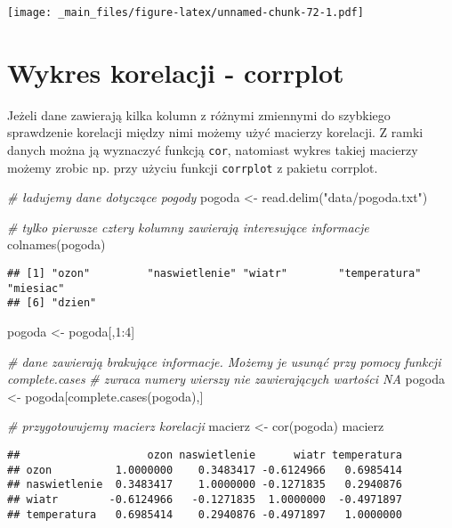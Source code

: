 \documentclass[
]{book}
\newenvironment{Shaded}{\begin{snugshade}}{\end{snugshade}}
\newcommand{\CommentTok}[1]{\textcolor[rgb]{0.56,0.35,0.01}{\textit{#1}}}
\newcommand{\DecValTok}[1]{\textcolor[rgb]{0.00,0.00,0.81}{#1}}
\newcommand{\FunctionTok}[1]{\textcolor[rgb]{0.00,0.00,0.00}{#1}}
\newcommand{\NormalTok}[1]{#1}
\newcommand{\OtherTok}[1]{\textcolor[rgb]{0.56,0.35,0.01}{#1}}
\newcommand{\SpecialCharTok}[1]{\textcolor[rgb]{0.00,0.00,0.00}{#1}}
\newcommand{\StringTok}[1]{\textcolor[rgb]{0.31,0.60,0.02}{#1}}
\begin{document}
\texttt{[image: \_main\_files/figure-latex/unnamed-chunk-72-1.pdf]}

\hypertarget{wykres-korelacji---corrplot}{%
\section{Wykres korelacji - corrplot}\label{wykres-korelacji---corrplot}}

Jeżeli dane zawierają kilka kolumn z różnymi zmiennymi do szybkiego sprawdzenie korelacji między nimi możemy użyć macierzy korelacji. Z ramki danych można ją wyznaczyć funkcją \texttt{cor}, natomiast wykres takiej macierzy możemy zrobic np. przy użyciu funkcji \texttt{corrplot} z pakietu corrplot.

\begin{Shaded}
\begin{Highlighting}[]
\CommentTok{\# ładujemy dane dotyczące pogody}
\NormalTok{pogoda }\OtherTok{\textless{}{-}} \FunctionTok{read.delim}\NormalTok{(}\StringTok{"data/pogoda.txt"}\NormalTok{)}

\CommentTok{\# tylko pierwsze cztery kolumny zawierają interesujące informacje}
\FunctionTok{colnames}\NormalTok{(pogoda)}
\end{Highlighting}
\end{Shaded}

\begin{verbatim}
## [1] "ozon"         "naswietlenie" "wiatr"        "temperatura"  "miesiac"     
## [6] "dzien"
\end{verbatim}

\begin{Shaded}
\begin{Highlighting}[]
\NormalTok{pogoda }\OtherTok{\textless{}{-}}\NormalTok{ pogoda[,}\DecValTok{1}\SpecialCharTok{:}\DecValTok{4}\NormalTok{]}

\CommentTok{\# dane zawierają brakujące informacje. Możemy je usunąć przy pomocy funkcji complete.cases}
\CommentTok{\# zwraca numery wierszy nie zawierających wartości NA}
\NormalTok{pogoda }\OtherTok{\textless{}{-}}\NormalTok{ pogoda[}\FunctionTok{complete.cases}\NormalTok{(pogoda),]}

\CommentTok{\# przygotowujemy macierz korelacji}
\NormalTok{macierz }\OtherTok{\textless{}{-}} \FunctionTok{cor}\NormalTok{(pogoda)}
\NormalTok{macierz}
\end{Highlighting}
\end{Shaded}

\begin{verbatim}
##                    ozon naswietlenie      wiatr temperatura
## ozon          1.0000000    0.3483417 -0.6124966   0.6985414
## naswietlenie  0.3483417    1.0000000 -0.1271835   0.2940876
## wiatr        -0.6124966   -0.1271835  1.0000000  -0.4971897
## temperatura   0.6985414    0.2940876 -0.4971897   1.0000000
\end{verbatim}
\end{document}

